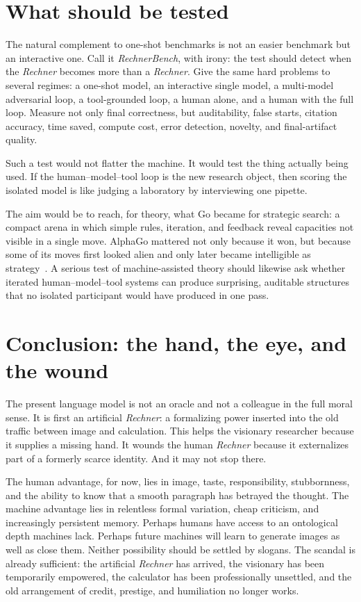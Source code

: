 \documentclass[
  aps,
  reprint,
  superscriptaddress,
  floatfix,
  nofootinbib,
  longbibliography
]{revtex4-2}
\begin{document}
\section{What should be tested}

The natural complement to one-shot benchmarks is not an easier benchmark but an
interactive one. Call it \emph{RechnerBench}, with irony: the test should detect
when the \emph{Rechner} becomes more than a \emph{Rechner}. Give the same hard
problems to several regimes: a one-shot model, an interactive single model, a
multi-model adversarial loop, a tool-grounded loop, a human alone, and a human
with the full loop. Measure not only final correctness, but auditability, false
starts, citation accuracy, time saved, compute cost, error detection, novelty,
and final-artifact quality.

Such a test would not flatter the machine. It would test the thing actually
being used. If the human--model--tool loop is the new research object, then
scoring the isolated model is like judging a laboratory by interviewing one
pipette.

The aim would be to reach, for theory, what Go became for strategic search:
a compact arena in which simple rules,
iteration, and feedback reveal capacities not visible in a single move. AlphaGo
mattered not only because it won, but because some of its moves first looked
alien and only later became intelligible as strategy~\cite{Silver-2017}.
A serious test of machine-assisted theory should likewise ask whether iterated
human--model--tool systems can produce surprising, auditable structures that no
isolated participant would have produced in one pass.



\section{Conclusion: the hand, the eye, and the wound}

The present language model is not an oracle and not a colleague in the full moral
sense. It is first an artificial \emph{Rechner}: a formalizing power inserted
into the old traffic between image and calculation. This helps the visionary
researcher because it supplies a missing hand. It wounds the human
\emph{Rechner} because it externalizes part of a formerly scarce identity. And it
may not stop there.

The human advantage, for now, lies in image, taste, responsibility, stubbornness,
and the ability to know that a smooth paragraph has betrayed the thought. The
machine advantage lies in relentless formal variation, cheap criticism, and
increasingly persistent memory. Perhaps humans have access to an ontological
depth machines lack. Perhaps future machines will learn to generate images as
well as close them. Neither possibility should be settled by slogans. The scandal
is already sufficient: the artificial \emph{Rechner} has arrived, the visionary
has been temporarily empowered, the calculator has been professionally unsettled,
and the old arrangement of credit, prestige, and humiliation no longer works.
\end{document}
